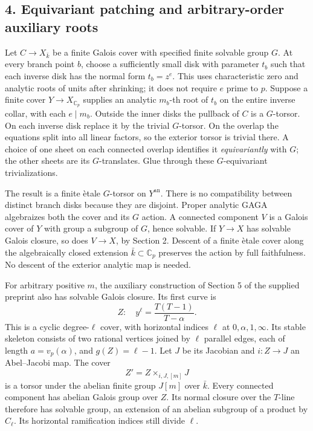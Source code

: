 \subsection*{4. Equivariant patching and arbitrary-order auxiliary roots}

Let $C\to X_{\bar k}$ be a finite Galois cover with specified finite
solvable group $G$.  At every branch point $b$, choose a sufficiently
small disk with parameter $t_b$ such that each inverse disk has the
normal form $t_b=z^{e}$.  This uses characteristic zero and analytic
roots of units after shrinking; it does not require $e$ prime to $p$.
Suppose a finite cover $Y\to X_{\mathbb C_p}$ supplies an analytic
$m_b$-th root of $t_b$ on the entire inverse collar, with each
$e\mid m_b$.  Outside the inner disks the pullback of $C$ is a
$G$-torsor.  On each inverse disk replace it by the trivial
$G$-torsor.  On the overlap the equations split into all linear
factors, so the exterior torsor is trivial there.  A choice of one
sheet on each connected overlap identifies it \emph{equivariantly}
with $G$; the other sheets are its $G$-translates.  Glue through
these $G$-equivariant trivializations.

The result is a finite \`etale $G$-torsor on $Y^{\mathrm{an}}$.
There is no compatibility between distinct branch disks because
they are disjoint.  Proper analytic GAGA algebraizes both the
cover and its $G$ action.  A connected component $V$ is a Galois
cover of $Y$ with group a subgroup of $G$, hence solvable.  If
$Y\to X$ has solvable Galois closure, so does $V\to X$, by
Section 2.  Descent of a finite \`etale cover along the algebraically
closed extension $\bar k\subset\mathbb C_p$ preserves the action
by full faithfulness.  No descent of the exterior analytic map is
needed.

For arbitrary positive $m$, the auxiliary construction of Section 5
of the supplied preprint also has solvable Galois closure.  Its
first curve is
\[
                  Z:\quad y^\ell=\frac{T(T-1)}{T-\alpha}.
\]
This is a cyclic degree-$\ell$ cover, with horizontal indices
$\ell$ at $0,\alpha,1,\infty$.  Its stable skeleton consists of
two rational vertices joined by $\ell$ parallel edges, each of
length $a=v_p(\alpha)$, and $g(Z)=\ell-1$.  Let $J$ be its
Jacobian and $i:Z\to J$ an Abel--Jacobi map.  The cover
\[
                       Z'=Z\times_{i,J,[m]}J
\]
is a torsor under the abelian finite group $J[m]$ over $\bar k$.
Every connected component has abelian Galois group over $Z$.
Its normal closure over the $T$-line therefore has solvable group,
an extension of an abelian subgroup of a product by $C_\ell$.
Its horizontal ramification indices still divide $\ell$.

